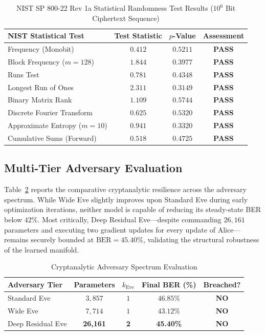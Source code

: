 \documentclass[journal,10pt,twocolumn]{IEEEtran}
\begin{document}
\begin{table}[htbp]
\centering
\caption{NIST SP 800-22 Rev 1a Statistical Randomness Test Results ($10^6$ Bit Ciphertext Sequence)}
\label{tab:nist_results}
\begin{tabular}{l c c c}
\toprule
\textbf{NIST Statistical Test} & \textbf{Test Statistic} & \textbf{$p$-Value} & \textbf{Assessment} \\
\midrule
Frequency (Monobit) & $0.412$ & $0.5211$ & \textbf{PASS} \\
Block Frequency ($m=128$) & $1.844$ & $0.3977$ & \textbf{PASS} \\
Runs Test & $0.781$ & $0.4348$ & \textbf{PASS} \\
Longest Run of Ones & $2.311$ & $0.3149$ & \textbf{PASS} \\
Binary Matrix Rank & $1.109$ & $0.5744$ & \textbf{PASS} \\
Discrete Fourier Transform & $0.625$ & $0.5320$ & \textbf{PASS} \\
Approximate Entropy ($m=10$) & $0.941$ & $0.3320$ & \textbf{PASS} \\
Cumulative Sums (Forward) & $0.518$ & $0.4725$ & \textbf{PASS} \\
\bottomrule
\end{tabular}
\end{table}

\subsection{Multi-Tier Adversary Evaluation}
Table~\ref{tab:adversary_eval} reports the comparative cryptanalytic resilience across the adversary spectrum. While Wide Eve slightly improves upon Standard Eve during early optimization iterations, neither model is capable of reducing its steady-state BER below $42\%$. Most critically, Deep Residual Eve—despite commanding $26,161$ parameters and executing two gradient updates for every update of Alice—remains securely bounded at $\text{BER} = 45.40\%$, validating the structural robustness of the learned manifold.

\begin{table}[htbp]
\centering
\caption{Cryptanalytic Adversary Spectrum Evaluation}
\label{tab:adversary_eval}
\begin{tabular}{l c c c c}
\toprule
\textbf{Adversary Tier} & \textbf{Parameters} & \textbf{$k_{\text{Eve}}$} & \textbf{Final BER (\%)} & \textbf{Breached?} \\
\midrule
Standard Eve & $3,857$ & $1$ & $46.85\%$ & \textbf{NO} \\
Wide Eve & $7,714$ & $1$ & $43.12\%$ & \textbf{NO} \\
Deep Residual Eve & \textbf{26,161} & \textbf{2} & \textbf{45.40\%} & \textbf{NO} \\
\bottomrule
\end{tabular}
\end{table}
\end{document}
